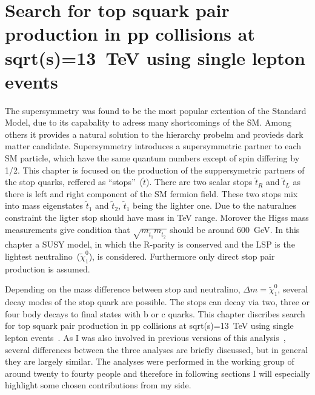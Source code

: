 \chapter{Search for top squark pair production in pp collisions at sqrt(s)=13~TeV using single lepton events}


The supersymmetry was found to be the most popular extention of the Standard Model, due to its capabality to adress many shortcomings of the SM. Among others it provides a natural solution to the hierarchy probelm and provieds dark matter candidate. Supersymmetry introduces a supersymmetric partner to each SM particle, which have the same quantum numbers except of spin differing by 1/2. This chapter is focused on the production of the suppersymetric partners of the stop quarks, reffered as ``stops''~($\tilde{t}$). There are two scalar stops $\tilde{t}_{R}$ and  $\tilde{t}_{L}$ as there is left and right component of the SM fermion field. These two stops mix into mass eigenstates $\tilde{t}_{1}$ and $\tilde{t}_{2}$,  $\tilde{t}_{1}$ being the lighter one. Due to the naturalnes constraint the ligter stop should have mass in TeV range. Morover the Higss mass measurements give condition that $\sqrt{m_{\tilde{t}_{1}} m_{\tilde{t}_{2}}}$ should be around 600~GeV. In this chapter a SUSY model, in which the R-parity is conserved and the LSP is the lightest neutralino~($\tilde{\chi}^{0}_{1}$), is considered. Furthermore only direct stop pair production is assumed.

Depending on the mass difference between stop and neutralino, $\Delta m =  \tilde{\chi}^{0}_{1}$, several decay modes of the stop quark are possible. The stops can decay via two, three or four body decays to final states with b or c quarks. This chapter discribes search for top squark pair production in pp collisions at sqrt(s)=13~TeV using single lepton events~\cite{Sirunyan:2017xse}. As I was also involved in previous versions of this analysis~\cite{Sirunyan:2016jpr, CMS:2016vew}, several differences between the three analyses are briefly discussed, but in general they are largely similar. The analyses were performed in the working group of around twenty to fourty people and therefore in following sections I will especially highlight some chosen contributions from my side.


